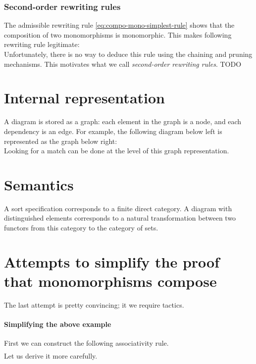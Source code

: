 \documentclass{article}
\begin{document}
\subsubsection{Second-order rewriting rules}
The admissible rewriting rule \eqref{eq:compo-mono-simplest-rule} shows that the composition of two monomorphisms is monomorphic.
This makes following rewriting rule legitimate:
\[

\]
Unfortunately, there is no way to deduce this rule using the chaining and pruning mechanisms.
This motivates what we call \emph{second-order rewriting rules}.
TODO
\section{Internal representation}
A diagram is stored as a graph: 
each element in the graph is a node, and each dependency is an edge.
For example, the following diagram below left is represented as the graph below right:
\[

\]
Looking for a match can be done at the level of this graph representation.
\section{Semantics}
A sort specification corresponds to a finite direct category. 
A diagram with distinguished elements corresponds to a 
natural transformation between two functors from this category to the category of sets.
\appendix
\section{Attempts to simplify the proof that monomorphisms compose}
The last attempt is pretty convincing; it we require tactics.
\label{app:simplified-proof}
\paragraph{Simplifying the above example}
First we can construct the following associativity rule.
\begin{align}
    
    \tag{Comp-Assoc}
    \label{eq:comp-assoc}
\end{align}
Let us derive it more carefully.
\begin{align*}
    
\end{align*}
\end{document}
